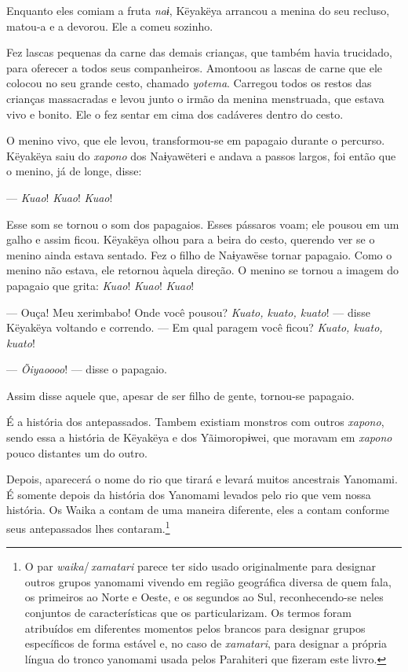 Enquanto eles comiam a fruta \textit{naɨ}, Këyakëya arrancou a menina do
seu recluso, matou-a e a devorou. Ele a comeu sozinho. 

Fez lascas pequenas da carne das demais crianças, que também havia
trucidado, para oferecer a todos seus companheiros. Amontoou as lascas de
carne que ele colocou no seu grande cesto, chamado \textit{yotema}.
Carregou todos os restos das crianças massacradas e levou junto o irmão
da menina menstruada, que estava vivo e bonito. Ele o fez sentar em cima
dos cadáveres dentro do cesto. 

O menino vivo, que ele levou, transformou-se em papagaio durante o
percurso. Këyakëya saiu do \textit{xapono} dos Naɨyawëteri e andava a passos
largos, foi então que o menino, já de longe, disse: 

--- \textit{Kuao}! \textit{Kuao}! \textit{Kuao}!

Esse som se tornou o som dos papagaios. Esses pássaros voam; ele pousou
em um galho e assim ficou. Këyakëya olhou para a beira do cesto,
querendo ver se o menino ainda estava sentado. Fez o filho de Naɨyawëse
tornar papagaio. Como o menino não estava, ele retornou àquela direção.
O menino se tornou a imagem do papagaio que grita: \textit{Kuao}! \textit{Kuao}!
\textit{Kuao}!

--- Ouça! Meu xerimbabo! Onde você pousou? \textit{Kuato, kuato, kuato}! ---
disse Këyakëya voltando e correndo. --- Em qual paragem você
ficou? \textit{Kuato, kuato, kuato}!

--- \textit{Õiyaoooo}! --- disse o papagaio. 

Assim disse aquele que, apesar de ser filho de gente, tornou-se
papagaio. 

É a história dos antepassados. Tambem existiam monstros com outros
\textit{xapono}, sendo essa a história de Këyakëya e dos Yãimoropɨwei, que
moravam em \textit{xapono} pouco distantes um do outro. 

Depois, aparecerá o nome do rio que tirará e levará muitos ancestrais
Yanomami. É somente depois da história dos Yanomami levados pelo rio que
vem nossa história. Os Waika a contam de uma maneira diferente, eles a
contam conforme seus antepassados lhes contaram.\footnote{O par \textit{waika}/\,\textit{xamatari} parece ter sido usado originalmente para designar outros grupos yanomami vivendo em região geográfica diversa de quem fala, os primeiros ao Norte e Oeste, e os segundos ao Sul, reconhecendo-se neles conjuntos de características que os particularizam. Os termos foram atribuídos em diferentes momentos pelos brancos para designar grupos específicos de forma estável e, no caso de \textit{xamatari}, para designar a própria língua do tronco yanomami usada pelos Parahiteri que fizeram este livro.} 


